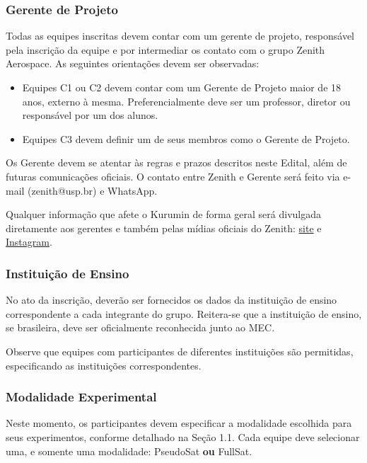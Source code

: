         \subsubsection{Gerente de Projeto}
            Todas as equipes inscritas devem contar com um gerente de projeto, responsável pela inscrição da equipe e por intermediar os contato com o grupo Zenith Aerospace. As seguintes orientações devem ser observadas:
            
            \begin{itemize}
                \item Equipes C1 ou C2 devem contar com um Gerente de Projeto maior de 18 anos, externo à mesma. Preferencialmente deve ser um professor, diretor ou responsável por um dos alunos.
                \item  Equipes C3 devem definir um de seus membros como o Gerente de Projeto.
            \end{itemize}
    
            Os Gerente devem se atentar às regras e prazos descritos neste Edital, além de futuras comunicações oficiais. O contato entre Zenith e Gerente será feito via e-mail (zenith@usp.br) e WhatsApp.
            
            Qualquer informação que afete o Kurumin de forma geral será divulgada diretamente aos gerentes e também pelas mídias oficiais do Zenith: \href{https://zenith.eesc.usp.br/kurumim}{site} e \href{https://www.instagram.com/zenith\_eesc/}{Instagram}.
    
        \subsubsection{Instituição de Ensino}
            No ato da inscrição, deverão ser fornecidos os dados da instituição de ensino correspondente a cada integrante do grupo. Reitera-se que a instituição de ensino, se brasileira, deve ser oficialmente reconhecida junto ao MEC.
    
            Observe que equipes com participantes de diferentes instituições são permitidas, especificando as instituições correspondentes.

        \subsubsection{Modalidade Experimental}
            Neste momento, os participantes devem especificar a modalidade escolhida para seus experimentos, conforme detalhado na Seção 1.1. Cada equipe deve selecionar uma, e somente uma modalidade: PseudoSat \textbf{ou} FullSat.

